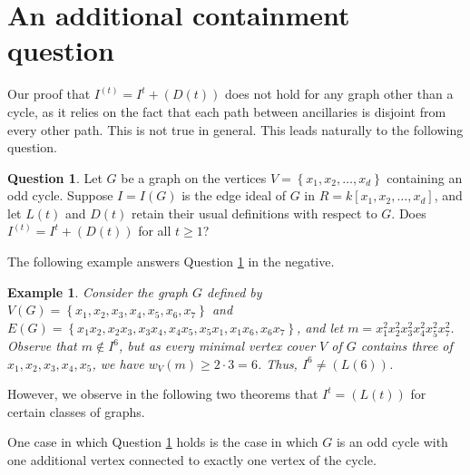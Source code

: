 \documentclass[12pt]{amsart}
\def\set#1{\left\{ {#1} \right\}}
\renewcommand{\ge}{\geqslant}
\theoremstyle{plain}
\newtheorem{ex}[theorem]{Example}
\theoremstyle{definition}
\newtheorem{question}[theorem]{Question}
\begin{document}
\section{An additional containment question}\label{sec:future}
Our proof that $I^{(t)} = I^t + (D(t))$ does not hold for any graph other than a cycle, as it relies on the fact that each path between ancillaries is disjoint from every other path. This is not true in general.
This leads naturally to the following question.

\begin{question}\label{conj:anygraph}
	Let $G$ be a graph on the vertices $V = \set{x_1,x_2,\ldots,x_d}$ containing an odd cycle. %
	Suppose $I = I(G)$ is the edge ideal of $G$ in $R = k[x_1,x_2,\ldots,x_d]$, and let $L(t)$ and  $D(t)$ retain their usual definitions with respect to $G$.
	Does $I^{(t)} = I^t + (D(t))$ for all $t \ge 1$?
\end{question}


The following example answers Question \ref{conj:anygraph} in the negative.

\begin{ex}
	Consider the graph $G$ defined by $V(G) = \set{x_1, x_2, x_3, x_4, x_5, x_6, x_7}$ and $E(G) = \set{x_1 x_2, x_2 x_3, x_3 x_4, x_4 x_5, x_5 x_1, x_1 x_6, x_6 x_7}$, and let $m = x_1^2 x_2^2 x_3^2 x_4^2 x_5^2 x_7^2$.
	Observe that $m\notin I^6$, but as every minimal vertex cover $V$ of $G$ contains three of $x_1, x_2, x_3, x_4, x_5$, we have $w_V(m) \ge 2\cdot 3 = 6$.
	Thus, $I^6 \ne (L(6))$.
\end{ex}

However, we observe in the following two theorems that $I^t = (L(t))$ for certain classes of graphs.



One case in which Question \ref{conj:anygraph} holds is the case in which $G$ is an odd cycle with one additional vertex connected to exactly one vertex of the cycle. %
\end{document}
